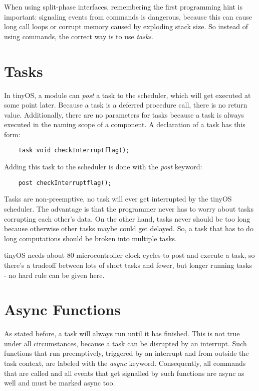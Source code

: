 When using split-phase interfaces, remembering the first programming hint is important: signaling events from commands is dangerous, because this can cause long call loops or corrupt memory caused by exploding stack size.
So instead of using commands, the correct way is to use \textit{tasks}.

\section{Tasks}

In tinyOS, a module can \textit{post} a task to the scheduler, which will get executed at some point later. 
Because a task is a deferred procedure call, there is no return value. Additionally, there are no parameters for tasks because a task is always executed in the naming scope of a component. A declaration of a task has this form:

\lstset{language=C}
\begin{lstlisting}
	task void checkInterruptflag();
\end{lstlisting}

Adding this task to the scheduler is done with the \textit{post} keyword: 

\lstset{language=C}
\begin{lstlisting}
	post checkInterruptflag();
\end{lstlisting}

Tasks are non-preemptive, no task will ever get interrupted by the tinyOS scheduler. The advantage is that the programmer never has to worry about tasks corrupting each other's data. On the other hand, tasks never should be too long because otherwise other tasks maybe could get delayed. So, a task that has to do long computations should be broken into multiple tasks.

tinyOS needs about 80 microcontroller clock cycles to post and execute a task, so there's a tradeoff between lots of short tasks and fewer, but longer running tasks - no hard rule can be given here.

\section{Async Functions}

As stated before, a task will always run until it has finished. This is not true under all circumstances, because
a task can be disrupted by an interrupt. Such functions that run preemptively, triggered by an interrupt and from outside the task context, are labeled with the \textit{async} keyword. Consequently, all commands that are called and all events that get signalled by such functions are async as well and must be marked async too.

